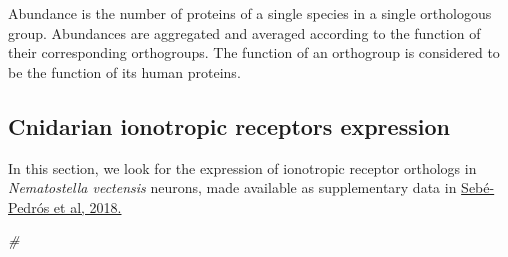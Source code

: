 \documentclass[
]{article}
\newenvironment{Shaded}{\begin{snugshade}}{\end{snugshade}}
\newcommand{\CommentTok}[1]{\textcolor[rgb]{0.33,0.33,0.33}{\textit{#1}}}
\renewenvironment{Shaded}{\scriptsize\begin{blackbox}}{\end{blackbox}}
\begin{document}
Abundance is the number of proteins of a single species in a single
orthologous group. Abundances are aggregated and averaged according to
the function of their corresponding orthogroups. The function of an
orthogroup is considered to be the function of its human proteins.


\hypertarget{cnidarian-ionotropic-receptors-expression}{%
\subsection{Cnidarian ionotropic receptors
expression}\label{cnidarian-ionotropic-receptors-expression}}

In this section, we look for the expression of ionotropic receptor
orthologs in \emph{Nematostella vectensis} neurons, made available as
supplementary data in
\href{https://doi.org/10.1016/j.cell.2018.05.019}{Sebé-Pedrós et al,
2018.} 

\renewenvironment{Shaded}{\scriptsize\begin{whitebox}}{\end{whitebox}}

\begin{Shaded}
\begin{Highlighting}[]
\CommentTok{#}
\end{Highlighting}
\end{Shaded}
\end{document}
